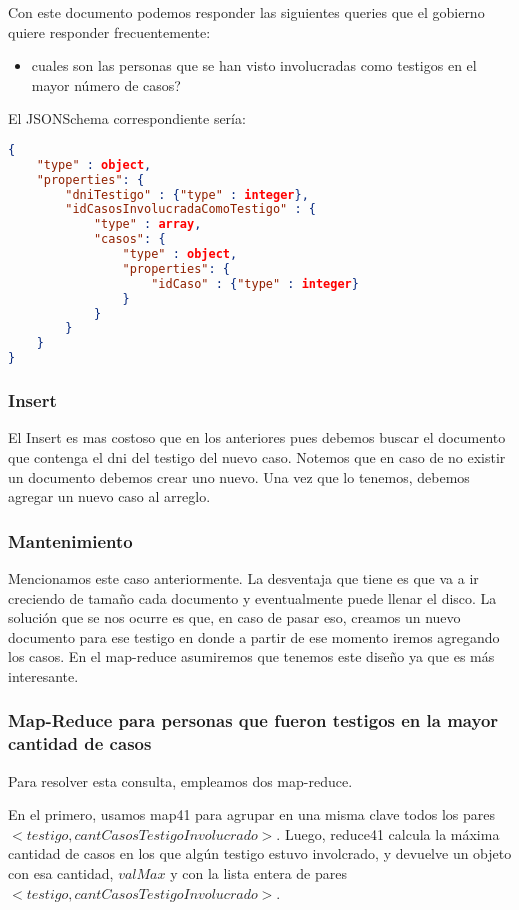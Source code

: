 \documentclass[11pt, a4paper]{article}
\begin{document}
Con este documento podemos responder las siguientes queries que el gobierno quiere responder frecuentemente:
\begin{itemize}
	\item cuales son las personas que se han visto involucradas como testigos en el mayor número de casos?
\end{itemize}

El JSONSchema correspondiente sería:
\begin{lstlisting}[language=json]
{
	"type" : object,
	"properties": {
		"dniTestigo" : {"type" : integer},
		"idCasosInvolucradaComoTestigo" : {
			"type" : array,
			"casos": {
				"type" : object,
				"properties": {
					"idCaso" : {"type" : integer}
				}
			}
		}
	}
}
\end{lstlisting}

\subsubsection{Insert}

El Insert es mas costoso que en los anteriores pues debemos buscar el documento que contenga el dni del testigo del nuevo caso. Notemos que en caso de no existir un documento debemos crear uno nuevo. Una vez que lo tenemos, debemos agregar un nuevo caso al arreglo.

\subsubsection{Mantenimiento}

Mencionamos este caso anteriormente. La desventaja que tiene es que va a ir creciendo de tama\~no cada documento y eventualmente puede llenar el disco. La soluci\'on que se nos ocurre es que, en caso de pasar eso, creamos un nuevo documento para ese testigo en donde a partir de ese momento iremos agregando los casos. En el map-reduce asumiremos que tenemos este dise\~no ya que es m\'as interesante.

\subsubsection{Map-Reduce para personas que fueron testigos en la mayor cantidad de casos}

Para resolver esta consulta, empleamos dos map-reduce.

En el primero, usamos map41 para agrupar en una misma clave todos los pares $<testigo, cantCasosTestigoInvolucrado>$. Luego, reduce41 calcula la máxima cantidad de casos en los que algún testigo estuvo involcrado, y devuelve un objeto con esa cantidad, $valMax$ y con la lista entera de pares $<testigo, cantCasosTestigoInvolucrado>$. 
\end{document}
